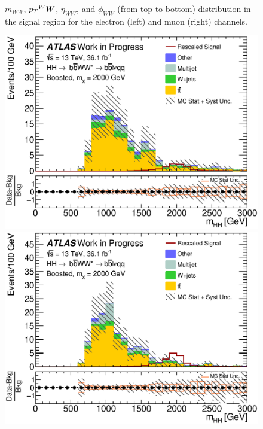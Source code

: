 \begin{figure}[h]
\begin{center}
\caption[Kinematic distributions in the signal region for the electron and muon channels]{$m_{WW}$, $\pt^WW$, $\eta_{WW}$, and $\phi_{WW}$ (from top to bottom) distribution in the signal region for the electron (left) and muon (right) channels.}
\end{center}
\end{figure}
\newpage

\begin{figure}[h]
\begin{center}
\includegraphics[scale=0.33]{figures/kinplots/C_2tag_SR_elec_presel_met50_hhMassRebin1}
\includegraphics[scale=0.33]{figures/kinplots/C_2tag_SR_muon_presel_met50_hhMassRebin1}\\

\end{center}
\end{figure}
